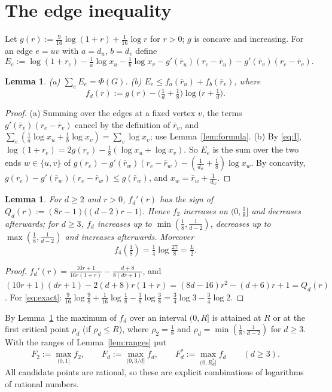 \documentclass[11pt]{amsart}
\theoremstyle{plain}
\newtheorem{lemma}[theorem]{Lemma}
\theoremstyle{remark}
\newcommand{\rb}{\bar r}
\begin{document}
\section{The edge inequality}\label{sec:edge}

Let $g(r):=\frac9{16}\log(1+r)+\frac1{16}\log r$ for $r>0$; $g$ is concave and increasing. For an edge $e=uv$ with
$a=d_u$, $b=d_v$ define
\[
 E_e:=\log(1+r_e)-\tfrac1a\log x_u-\tfrac1b\log x_v-g'(\rb_u)(r_e-\rb_u)-g'(\rb_v)(r_e-\rb_v).
\]

\begin{lemma}\label{lem:sum}
\textup{(a)} $\sum_{e}E_e=\Phi(G)$. \quad\textup{(b)} $E_e\le f_a(\rb_u)+f_b(\rb_v)$, where
\[
 f_d(r):=g(r)-\bigl(\tfrac1d+\tfrac18\bigr)\log\bigl(r+\tfrac1d\bigr).
\]
\end{lemma}
\begin{proof}
(a) Summing over the edges at a fixed vertex $v$, the terms $g'(\rb_v)(r_e-\rb_v)$ cancel by the definition of
$\rb_v$, and $\sum_e(\frac1a\log x_u+\frac1b\log x_v)=\sum_v\log x_v$; use Lemma~\ref{lem:formula}.
(b) By \eqref{eq:I}, $\log(1+r_e)=2g(r_e)-\frac18(\log x_u+\log x_v)$. So $E_e$ is the sum over the two ends
$w\in\{u,v\}$ of $g(r_e)-g'(\rb_w)(r_e-\rb_w)-(\frac1{d_w}+\frac18)\log x_w$. By concavity,
$g(r_e)-g'(\rb_w)(r_e-\rb_w)\le g(\rb_w)$, and $x_w=\rb_w+\frac1{d_w}$.
\end{proof}

\begin{lemma}\label{lem:onevar}
For $d\ge2$ and $r>0$, $f_d'(r)$ has the sign of $Q_d(r):=(8r-1)\bigl((d-2)r-1\bigr)$. Hence $f_2$ increases on
$(0,\frac18]$ and decreases afterwards; for $d\ge3$, $f_d$ increases up to $\min(\frac18,\frac1{d-2})$, decreases
up to $\max(\frac18,\frac1{d-2})$ and increases afterwards. Moreover
\begin{equation}\label{eq:exact}
 f_4(\tfrac18)=\tfrac14\log\tfrac{27}{8}=\tfrac L2 .
\end{equation}
\end{lemma}
\begin{proof}
$f_d'(r)=\frac{10r+1}{16r(1+r)}-\frac{d+8}{8(dr+1)}$, and
$(10r+1)(dr+1)-2(d+8)r(1+r)=(8d-16)r^2-(d+6)r+1=Q_d(r)$. For \eqref{eq:exact}:
$\frac9{16}\log\frac98+\frac1{16}\log\frac18-\frac38\log\frac38=\frac34\log3-\frac34\log2$.
\end{proof}

By Lemma~\ref{lem:onevar} the maximum of $f_d$ over an interval $(0,R]$ is attained at $R$ or at the first
critical point $\rho_d$ (if $\rho_d\le R$), where $\rho_2=\frac18$ and $\rho_d=\min(\frac18,\frac1{d-2})$ for
$d\ge3$. With the ranges of Lemma~\ref{lem:ranges} put
\[
 F_2:=\max_{(0,1]}f_2,\qquad F_d:=\max_{(0,3/d]}f_d,\qquad F^*_d:=\max_{(0,R^*_d]}f_d\qquad(d\ge3).
\]
All candidate points are rational, so these are explicit combinations of logarithms of rational numbers.
\end{document}

